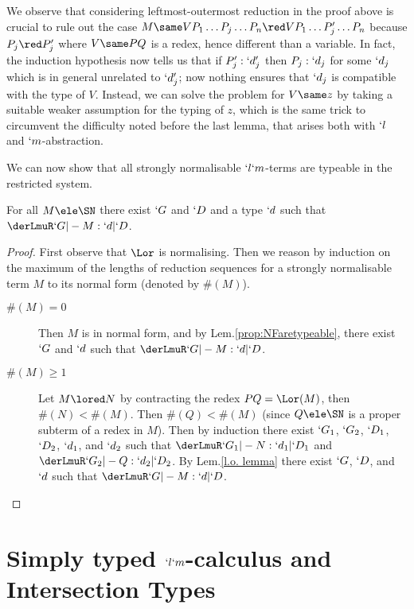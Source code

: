 \documentclass{CSML}
\begin{document}
We observe that considering leftmost-outermost reduction in the proof above is crucial to rule out the case $M \same V P_1 \dots P_j \dots P_n \red V P_1 \dots P'_j \dots P_n$ because $P_j\red P'_j$ where $V \same PQ$ is a redex, hence different than a variable. 
In fact, the induction hypothesis now tells us that if $P'_j:`d'_j$ then $P_j:`d_j$ for some $`d_j$ which is in general unrelated to $`d'_j$; now nothing ensures that $`d_j$ is compatible with the type of $V$. 
Instead, we can solve the problem for $V \same z$ by taking a suitable weaker assumption for the typing of $z$, which is the same trick to circumvent the difficulty noted before the last lemma, that arises both with $`l$ and $`m$-abstraction.

We can now show that all strongly normalisable $`l`m$-terms are typeable in the restricted system.

 \begin{thm} \label{thm:typeableAreSN}
For all $M \ele \SN$ there exist $`G$ and $`D $ and a type $`d$ such that $ \derLmuR `G |- M : `d | `D $.
 \end{thm}

 \begin{proof}
First observe that $\Lor$ is normalising. %
Then we reason by induction on the maximum of the lengths of reduction sequences for a strongly normalisable term $M$ to its normal form (denoted by $\#(M)$).

 \begin {description}
 \item [$ \#(M) = 0 $] 
Then $M$ is in normal form, and by Lem.\skp\ref{prop:NFaretypeable}, there exist $`G$ and $ `d$ such that $\derLmuR `G |- M : `d | `D $.

 \item [$ \#(M)\geq 1 $] 
Let $M\lored N$ by contracting the redex $PQ = \Lor(M)$, then $\#(N) < \#(M)$.
Then $\#(Q) < \#(M)$ (since $Q \ele \SN$ is a proper subterm of a redex in $M$). Then by induction there exist $`G_1$, $`G_2$, $`D_1$, $`D_2$, $`d_1$, and $`d_2$ such that $\derLmuR `G_1 |- N : `d_1 | `D_1 $ and $\derLmuR `G_2 |- Q : `d_2 | `D_2 $.
By Lem.\skp\ref {l.o. lemma} there exist $`G$, $`D $, and $ `d$ such that $\derLmuR `G |- M : `d | `D $.%
\qedhere
 \end{description}
 \end{proof}


 \section{Simply typed \texorpdfstring{$`l`m$}{lambda-mu}-calculus and Intersection Types} \label{sec:Parigot}
\end{document}
